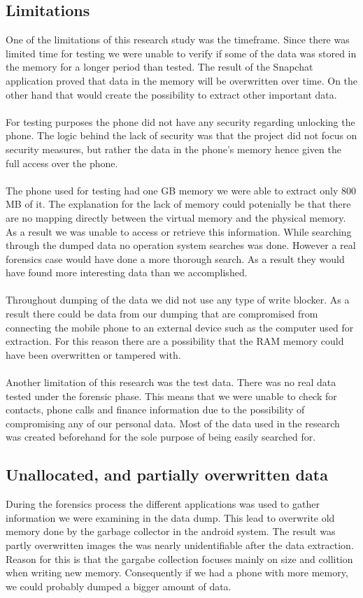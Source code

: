 \subsection{Limitations}
One of the limitations of this research study was the timeframe. Since there was limited time for testing we were unable to verify if some of the data was stored in the memory for a longer period than tested. The result of the Snapchat application proved that data in the memory will be overwritten over time. On the other hand that would create the possibility to extract other important data. \\\\
For testing purposes the phone did not have any security regarding unlocking the phone. The logic behind the lack of security was that the project did not focus on security measures, but rather the data in the phone's memory hence given the full access over the phone. \\\\
The phone used for testing had one GB memory we were able to extract only 800 MB of it. The explanation for the lack of memory could potenially be that there are no mapping directly between the virtual memory and the physical memory. As a result we was unable to access or retrieve this information. While searching through the dumped data no operation system searches was done. However a real forensics case would have done a more thorough search. As a result they would have found more interesting data than we accomplished. \\\\
Throughout dumping of the data we did not use any type of write blocker. As a result there could be data from our dumping that are compromised from connecting the mobile phone to an external device such as the computer used for extraction. For this reason there are a possibility that the RAM memory could have been overwritten or tampered with. \\\\
Another limitation of this research was the test data. There was no real data tested under the forensic phase. This means that we were unable to check for contacts, phone calls and finance information due to the possibility of compromising any of our personal data. Most of the data used in the research was created beforehand for the sole purpose of being easily searched for. 
\subsection{Unallocated, and partially overwritten data}
During the forensics process the different applications was used to gather information we were examining in the data dump. This lead to overwrite old memory done by the garbage collector in the android system. The result was partly overwritten images the was nearly unidentifiable after the data extraction. Reason for this is that the gargabe collection focuses mainly on size and collition when writing new memory. Consequently if we had a phone with more memory, we could probably dumped a bigger amount of data.
